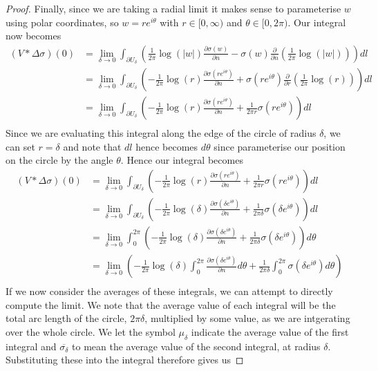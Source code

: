\documentclass[11pt]{report}
\theoremstyle{definition}
\begin{document}
\begin{proof}
  Finally, since we are taking a radial limit it makes sense to parameterise $w$ using polar coordinates, so $w=re^{i\theta}$ with $r\in [0, \infty)$ and $\theta \in [0, 2\pi)$. Our integral now becomes
  \begin{align*}
    (V * \Delta \sigma)(0) &= \lim_{\delta \rightarrow 0} \int_{\partial U_{\delta}}\left(\frac{1}{2\pi}\log(|w|)\frac{\partial \sigma(w)}{\partial n} - \sigma(w)\frac{\partial}{\partial n}\left(\frac{1}{2\pi}\log(|w|)\right)\right)dl \\
    &= \lim_{\delta \rightarrow 0} \int_{\partial U_{\delta}}\left( -\frac{1}{2\pi}\log(r)\frac{\partial \sigma(re^{i\theta})}{\partial n} + \sigma(re^{i\theta})\frac{\partial}{\partial r}\left(\frac{1}{2\pi}\log(r)\right)\right)dl \\
    &= \lim_{\delta \rightarrow 0} \int_{\partial U_{\delta}}\left( -\frac{1}{2\pi}\log(r)\frac{\partial \sigma(re^{i\theta})}{\partial n} + \frac{1}{2\pi r}\sigma(re^{i\theta})\right)dl \\
  \end{align*}
  Since we are evaluating this integral along the edge of the circle of radius $\delta$, we can set $r=\delta$ and note that $dl$ hence becomes $d\theta$ since parameterise our position on the circle by the angle $\theta$. Hence our integral becomes
  \begin{align*}
    (V * \Delta \sigma)(0) &= \lim_{\delta \rightarrow 0} \int_{\partial U_{\delta}}\left( -\frac{1}{2\pi}\log(r)\frac{\partial \sigma(re^{i\theta})}{\partial n} + \frac{1}{2\pi r}\sigma(re^{i\theta})\right)dl \\
    &= \lim_{\delta \rightarrow 0} \int_{\partial U_{\delta}}\left( -\frac{1}{2\pi}\log(\delta)\frac{\partial \sigma(\delta e^{i\theta})}{\partial n} + \frac{1}{2\pi \delta}\sigma(\delta e^{i\theta})\right)dl \\
    &= \lim_{\delta \rightarrow 0} \int_{0}^{2\pi}\left( -\frac{1}{2\pi}\log(\delta)\frac{\partial \sigma(\delta e^{i\theta})}{\partial n} + \frac{1}{2\pi \delta}\sigma(\delta e^{i\theta})\right)d\theta \\
    &= \lim_{\delta \rightarrow 0} \left( -\frac{1}{2\pi}\log(\delta) \int_{0}^{2\pi} \frac{\partial \sigma(\delta e^{i\theta})}{\partial n} d\theta + \frac{1}{2\pi \delta}\int_{0}^{2\pi}\sigma(\delta e^{i\theta})d\theta\right) \\
  \end{align*}
  If we now consider the averages of these integrals, we can attempt to directly compute the limit. We note that the average value of each integral will be the total arc length of the circle, $2\pi \delta$, multiplied by some value, as we are intgerating over the whole circle. We let the symbol $\mu_{\delta}$ indicate the average value of the first integral and $\overline{\sigma_{\delta}}$ to mean the average value of the second integral, at radius $\delta$. Substituting these into the integral therefore gives us

\end{proof}
\end{document}
